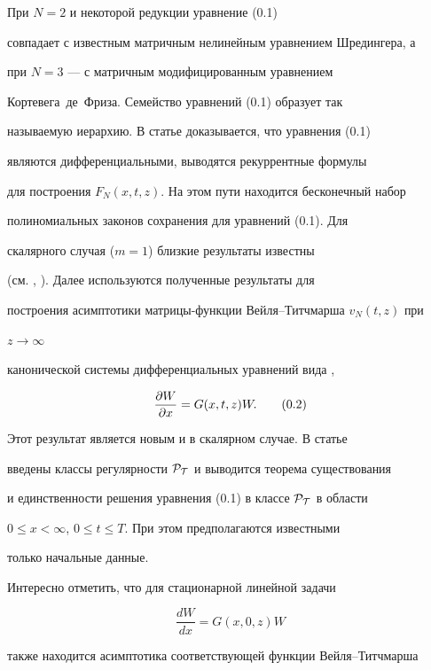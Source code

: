 При $N=2$ и некоторой редукции уравнение (0.1) 


совпадает с известным матричным нелинейным уравнением Шредингера, а 


при $N=3$ --- с матричным модифицированным уравнением 


Кортевега~де~Фриза. Семейство уравнений (0.1) образует так 


называемую иерархию. В статье доказывается, что уравнения (0.1) 


являются дифференциальными, выводятся рекуррентные формулы 


для построения $F_N(x,t,z)$. На этом пути находится бесконечный набор 


полиномиальных законов сохранения для уравнений (0.1). Для 


скалярного случая ($m=1$) близкие результаты известны 


(см. \cite{1}, \cite{2}). Далее используются полученные результаты для 


построения асимптотики матрицы-функции Вейля--Титчмарша $v_N(t,z)$ при 


$z\to\infty$


канонической системы дифференциальных уравнений вида \cite{3}, \cite{4} 


\begin{equation} 


\myfrac{W}{x}=G(x,t,z)W.\tag{0.2} 


\end{equation} 


Этот результат является новым и в скалярном случае. В статье 


введены классы регулярности $\cal P_T$ и выводится теорема существования 


и единственности решения уравнения (0.1) в классе $\cal P_T$ в области 


$0\le x<\infty$, $0\le t\le T$. При этом предполагаются известными 


только начальные данные. 


 


Интересно отметить, что для стационарной линейной задачи 


\begin{equation} 


\frac{d W}{d x}=G(x,0,z)W\tag{0.3} 


\end{equation} 


также находится асимптотика соответствующей функции Вейля--Титчмарша 



